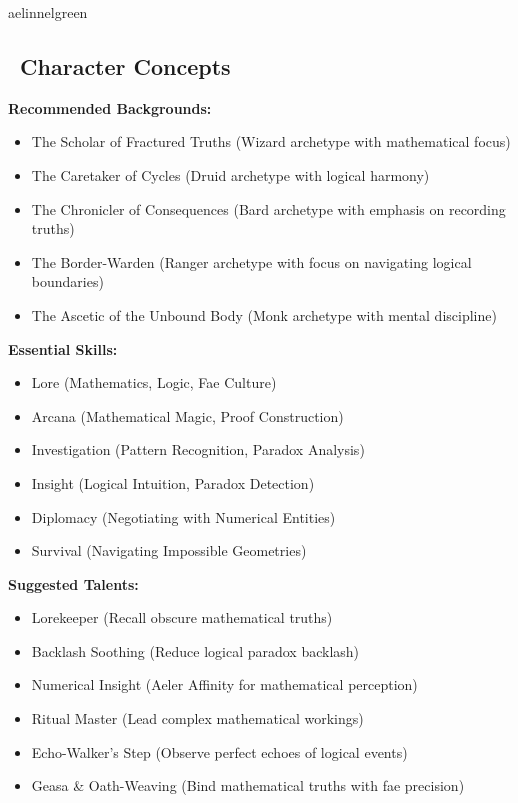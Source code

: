 \documentclass[11pt]{article}
\begin{document}
\begin{campaignsection}{aelinnelgreen}
\subsection*{\faUser\ Character Concepts}

\textbf{Recommended Backgrounds:}
\begin{itemize}
    \item The Scholar of Fractured Truths (Wizard archetype with mathematical focus)
    \item The Caretaker of Cycles (Druid archetype with logical harmony)
    \item The Chronicler of Consequences (Bard archetype with emphasis on recording truths)
    \item The Border-Warden (Ranger archetype with focus on navigating logical boundaries)
    \item The Ascetic of the Unbound Body (Monk archetype with mental discipline)
\end{itemize}

\textbf{Essential Skills:}
\begin{itemize}
    \item Lore (Mathematics, Logic, Fae Culture)
    \item Arcana (Mathematical Magic, Proof Construction)
    \item Investigation (Pattern Recognition, Paradox Analysis)
    \item Insight (Logical Intuition, Paradox Detection)
    \item Diplomacy (Negotiating with Numerical Entities)
    \item Survival (Navigating Impossible Geometries)
\end{itemize}

\textbf{Suggested Talents:}
\begin{itemize}
    \item Lorekeeper (Recall obscure mathematical truths)
    \item Backlash Soothing (Reduce logical paradox backlash)
    \item Numerical Insight (Aeler Affinity for mathematical perception)
    \item Ritual Master (Lead complex mathematical workings)
    \item Echo-Walker's Step (Observe perfect echoes of logical events)
    \item Geasa & Oath-Weaving (Bind mathematical truths with fae precision)
\end{itemize}


\end{campaignsection}
\end{document}
